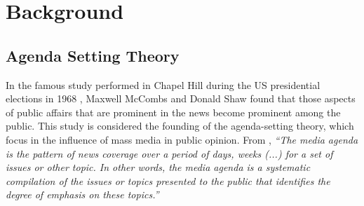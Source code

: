 \documentclass{bmcart}
\begin{document}
\begin{frontmatter}
\begin{abstractbox}
\begin{keyword}
\end{keyword}


\end{abstractbox}
%

\end{frontmatter}



\section*{Background}

\subsection*{Agenda Setting Theory}

\par In the famous study performed in Chapel Hill during the US presidential elections in 1968 \cite{mccombs1972agenda}, Maxwell McCombs and Donald Shaw found that those aspects of public affairs that are prominent in the news become prominent among the public.
This study is considered the founding of the agenda-setting theory, which focus in the influence of mass media in public opinion.  
From \cite{mccombs2014agenda}, \textit{``The media agenda is the pattern of news coverage over a period of days, weeks (...) for a set of issues or other topic. In other words, the media agenda is a systematic compilation of the issues or topics presented to the public that identifies the degree of emphasis on these topics.''}
\end{document}

